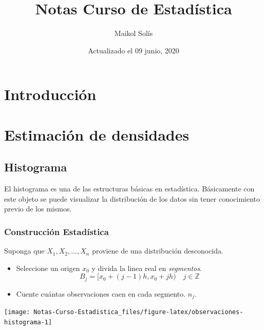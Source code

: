 \documentclass[
  12pt,
]{book}
\title{Notas Curso de Estadística}
\author{Maikol Solís}
\date{Actualizado el 09 junio, 2020}
\theoremstyle{definition}
\theoremstyle{definition}
\theoremstyle{definition}
\theoremstyle{remark}
\begin{document}
\maketitle

{
\hypersetup{linkcolor=}
\setcounter{tocdepth}{4}
\tableofcontents
}
\hypertarget{introducciuxf3n}{%
\chapter{Introducción}\label{introducciuxf3n}}

\hypertarget{estimaciuxf3n-de-densidades}{%
\chapter{Estimación de densidades}\label{estimaciuxf3n-de-densidades}}

\hypertarget{histograma}{%
\section{Histograma}\label{histograma}}

El histograma es una de las estructuras básicas en estadística. Básicamente con este objeto se puede visualizar la distribución de los datos sin tener conocimiento previo de los mismos.

\hypertarget{construcciuxf3n-estaduxedstica}{%
\subsection{Construcción Estadística}\label{construcciuxf3n-estaduxedstica}}

Suponga que \(X_1,X_2, \dots ,X_n\) proviene de una distribución desconocida.

\begin{itemize}
\item
  Seleccione un origen \(x_0\) y divida la linea real en \emph{segmentos}.
  \begin{equation*}
  B_j = [x_0 +(j - 1)h,x_0 + jh) \quad j\in \mathbb{Z}
  \end{equation*}
\item
  Cuente cuántas observaciones caen en cada segmento. \(n_j\).
\end{itemize}

\begin{center}\texttt{[image: Notas-Curso-Estadistica\_files/figure-latex/observaciones-histograma-1]} \end{center}
\end{document}
